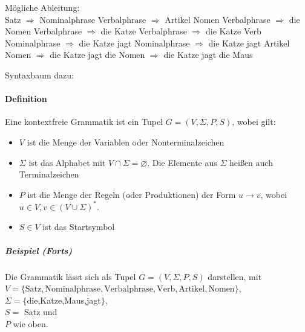 \documentclass[a4paper]{scrartcl}
\begin{document}
Mögliche Ableitung:\\
Satz $\Rightarrow$ Nominalphrase Verbalphrase $\Rightarrow$ Artikel Nomen Verbalphrase $\Rightarrow$ die Nomen Verbalphrase $\Rightarrow$ die Katze Verbalphrase $\Rightarrow$ die Katze Verb Nominalphrase $\Rightarrow$  die Katze jagt Nominalphrase $\Rightarrow$ die Katze jagt Artikel Nomen $\Rightarrow$ die Katze jagt die Nomen $\Rightarrow$ die Katze jagt die Maus

Syntaxbaum dazu:\\


\paragraph{Definition} Eine kontextfreie Grammatik ist ein Tupel $G=(V,\Sigma,P,S)$, wobei gilt:
\begin{itemize}
\item $V$ ist die Menge der Variablen oder Nonterminalzeichen
\item $\Sigma$ ist das Alphabet mit $V \cap \Sigma = \varnothing$. Die Elemente aus $\Sigma$ heißen auch Terminalzeichen
\item $P$ ist die Menge der Regeln (oder Produktionen) der Form $u \to v$, wobei $u \in V, v \in (V \cup \Sigma)^*$.
\item $S \in V$ ist das Startsymbol
\end{itemize}

\subparagraph{Beispiel (Forts)} Die Grammatik lässt sich als Tupel $G= (V,\Sigma,P,S)$ darstellen, mit $V=\{\text{Satz},\text{Nominalphrase},\text{Verbalphrase},\text{Verb},\text{Artikel},\text{Nomen}\}$,\\
$\Sigma = \{$die,Katze,Maus,jagt$\}$,\\
$S=$ Satz und\\
$P$ wie oben.
\end{document}
